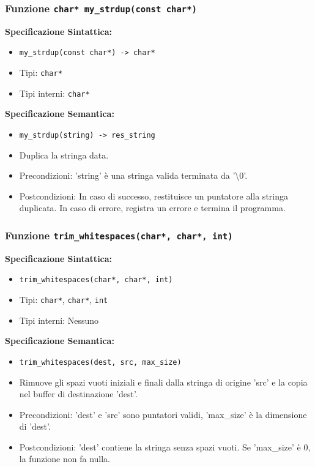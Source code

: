 \documentclass[11pt]{scrartcl} %
\begin{document}
\subsubsection{Funzione \texttt{char* my\_strdup(const char*)}}

\textbf{Specificazione Sintattica:}
\begin{itemize}
	\item \texttt{my\_strdup(const char*) -> char*}
	\item Tipi: \texttt{char*}
	\item Tipi interni: \texttt{char*}
\end{itemize}

\textbf{Specificazione Semantica:}
\begin{itemize}
	\item \texttt{my\_strdup(string) -> res\_string}
	\item Duplica la stringa data.
	\item Precondizioni: 'string' è una stringa valida terminata da '\textbackslash0'.
	\item Postcondizioni: In caso di successo, restituisce un puntatore alla stringa duplicata. In caso di errore, registra un errore e termina il programma.
\end{itemize}

\subsubsection{Funzione \texttt{trim\_whitespaces(char*, char*, int)}}

\textbf{Specificazione Sintattica:}
\begin{itemize}
	\item \texttt{trim\_whitespaces(char*, char*, int)}
	\item Tipi: \texttt{char*}, \texttt{char*}, \texttt{int}
	\item Tipi interni: Nessuno
\end{itemize}

\textbf{Specificazione Semantica:}
\begin{itemize}
	\item \texttt{trim\_whitespaces(dest, src, max\_size)}
	\item Rimuove gli spazi vuoti iniziali e finali dalla stringa di origine 'src' e la copia nel buffer di destinazione 'dest'.
	\item Precondizioni: 'dest' e 'src' sono puntatori validi, 'max\_size' è la dimensione di 'dest'.
	\item Postcondizioni: 'dest' contiene la stringa senza spazi vuoti. Se 'max\_size' è 0, la funzione non fa nulla.
\end{itemize}
\end{document}
